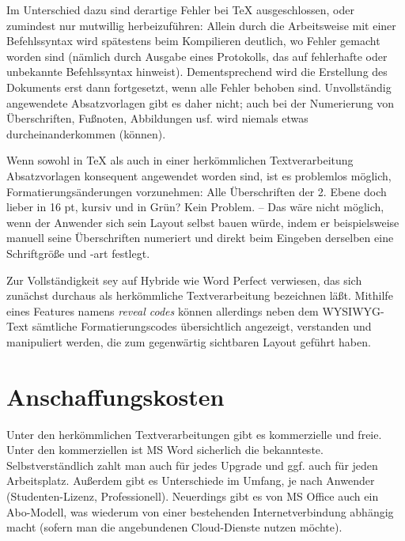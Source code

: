 \documentclass[11pt,a4paper,ngerman,DIV=8]{scrartcl}
\begin{document}

Im Unterschied dazu sind derartige Fehler bei \TeX{} ausgeschlossen, oder zumindest nur mutwillig herbeizuführen: Allein durch die Arbeitsweise mit einer Befehlssyntax wird spätestens beim Kompilieren deutlich, wo Fehler gemacht worden sind (nämlich durch Ausgabe eines Protokolls, das auf fehlerhafte oder unbekannte Befehlssyntax hinweist). Dementsprechend wird die Erstellung des Dokuments erst dann fortgesetzt, wenn alle Fehler behoben sind. Unvollständig angewendete Absatzvorlagen gibt es daher nicht; auch bei der Numerierung von Überschriften, Fußnoten, Abbildungen usf. wird niemals etwas durcheinanderkommen (können).

Wenn sowohl in \TeX{} als auch in einer herkömmlichen Textverarbeitung Absatzvorlagen konsequent angewendet worden sind, ist es problemlos möglich, Formatierungsänderungen vorzunehmen: Alle Überschriften der 2. Ebene doch lieber in 16 pt, kursiv und in Grün? Kein Problem. -- Das wäre nicht möglich, wenn der Anwender sich sein Layout selbst bauen würde, indem er beispielsweise manuell seine Überschriften numeriert und direkt beim Eingeben derselben eine Schriftgröße und -art festlegt.

Zur Vollständigkeit sey auf Hybride wie Word Perfect verwiesen, das sich zunächst durchaus als herkömmliche Textverarbeitung bezeichnen läßt. Mithilfe eines Features namens \emph{reveal codes} können allerdings neben dem WYSIWYG-Text sämtliche Formatierungscodes übersichtlich angezeigt, verstanden und manipuliert werden, die zum gegenwärtig sichtbaren Layout geführt haben.

\section{Anschaffungskosten}

Unter den herkömmlichen Textverarbeitungen gibt es kommerzielle und freie. Unter den kommerziellen ist MS Word sicherlich die bekannteste. Selbstverständlich zahlt man auch für jedes Upgrade und ggf. auch für jeden Arbeitsplatz. Außerdem gibt es Unterschiede im Umfang, je nach Anwender (Studenten-Lizenz, Professionell). Neuerdings gibt es von MS Office auch ein Abo-Modell, was wiederum von einer bestehenden Internetverbindung abhängig macht (sofern man die angebundenen Cloud-Dienste nutzen möchte).
\end{document}

